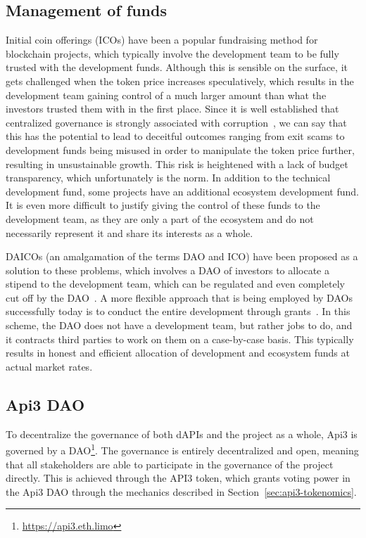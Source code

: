 \documentclass[11pt]{article}
\begin{document}
\subsection{Management of funds}
\label{sec:management-of-funds}

Initial coin offerings (ICOs) have been a popular fundraising method for blockchain projects, which typically involve the development team to be fully trusted with the development funds.
Although this is sensible on the surface, it gets challenged when the token price increases speculatively, which results in the development team gaining control of a much larger amount than what the investors trusted them with in the first place.
Since it is well established that centralized governance is strongly associated with corruption~\cite{fisman:2002}, we can say that this has the potential to lead to deceitful outcomes ranging from exit scams to development funds being misused in order to manipulate the token price further, resulting in unsustainable growth.
This risk is heightened with a lack of budget transparency, which unfortunately is the norm.
In addition to the technical development fund, some projects have an additional ecosystem development fund.
It is even more difficult to justify giving the control of these funds to the development team, as they are only a part of the ecosystem and do not necessarily represent it and share its interests as a whole.

DAICOs (an amalgamation of the terms DAO and ICO) have been proposed as a solution to these problems, which involves a DAO of investors to allocate a stipend to the development team, which can be regulated and even completely cut off by the DAO~\cite{buterin:2018}.
A more flexible approach that is being employed by DAOs successfully today is to conduct the entire development through grants~\cite{dxdao:2019}.
In this scheme, the DAO does not have a development team, but rather jobs to do, and it contracts third parties to work on them on a case-by-case basis.
This typically results in honest and efficient allocation of development and ecosystem funds at actual market rates.

\subsection{Api3 DAO}
\label{sec:api3-dao}

To decentralize the governance of both dAPIs and the project as a whole, Api3 is governed by a DAO\footnote{\url{https://api3.eth.limo}}.
The governance is entirely decentralized and open, meaning that all stakeholders are able to participate in the governance of the project directly.
This is achieved through the API3 token, which grants voting power in the Api3 DAO through the mechanics described in Section~\ref{sec:api3-tokenomics}.
\end{document}

